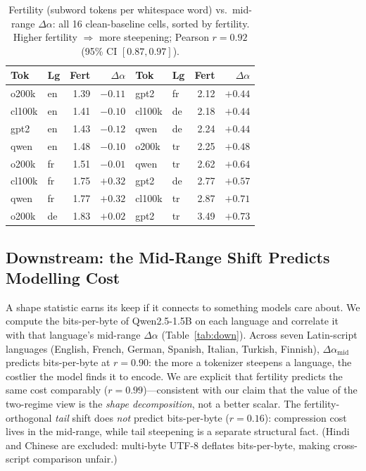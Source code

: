 \documentclass{article}
\begin{document}
\begin{table}[h]
  \caption{Fertility (subword tokens per whitespace word) vs.\ mid-range $\Delta\alpha$:
    all 16 clean-baseline cells, sorted by fertility. Higher fertility $\Rightarrow$ more
    steepening; Pearson $r = 0.92$ (95\% CI $[0.87, 0.97]$).}
  \label{tab:fertility}
  \centering\small
  \begin{tabular}{llrr@{\qquad}llrr}
    \toprule
    Tok & Lg & Fert & $\Delta\alpha$ & Tok & Lg & Fert & $\Delta\alpha$ \\
    \midrule
    o200k  & en & 1.39 & $-0.11$ & gpt2   & fr & 2.12 & $+0.44$ \\
    cl100k & en & 1.41 & $-0.10$ & cl100k & de & 2.18 & $+0.44$ \\
    gpt2   & en & 1.43 & $-0.12$ & qwen   & de & 2.24 & $+0.44$ \\
    qwen   & en & 1.48 & $-0.10$ & o200k  & tr & 2.25 & $+0.48$ \\
    o200k  & fr & 1.51 & $-0.01$ & qwen   & tr & 2.62 & $+0.64$ \\
    cl100k & fr & 1.75 & $+0.32$ & gpt2   & de & 2.77 & $+0.57$ \\
    qwen   & fr & 1.77 & $+0.32$ & cl100k & tr & 2.87 & $+0.71$ \\
    o200k  & de & 1.83 & $+0.02$ & gpt2   & tr & 3.49 & $+0.73$ \\
    \bottomrule
  \end{tabular}
\end{table}


\subsection{Downstream: the Mid-Range Shift Predicts Modelling Cost}
\label{sec:results_down}

A shape statistic earns its keep if it connects to something models care about. We
compute the bits-per-byte of Qwen2.5-1.5B on each language and correlate it with that
language's mid-range $\Delta\alpha$ (Table~\ref{tab:down}). Across seven Latin-script
languages (English, French, German, Spanish, Italian, Turkish, Finnish),
$\Delta\alpha_{\text{mid}}$ predicts bits-per-byte at $r = 0.90$: the more a
tokenizer steepens a language, the costlier the model finds it to encode. We are explicit
that fertility predicts the same cost comparably ($r = 0.99$)---consistent with our claim
that the value of the two-regime view is the \emph{shape decomposition}, not a better
scalar. The fertility-orthogonal \emph{tail} shift does \emph{not} predict bits-per-byte
($r = 0.16$): compression cost lives in the mid-range, while tail steepening is a separate
structural fact. (Hindi and Chinese are excluded: multi-byte UTF-8 deflates bits-per-byte,
making cross-script comparison unfair.)
\end{document}
